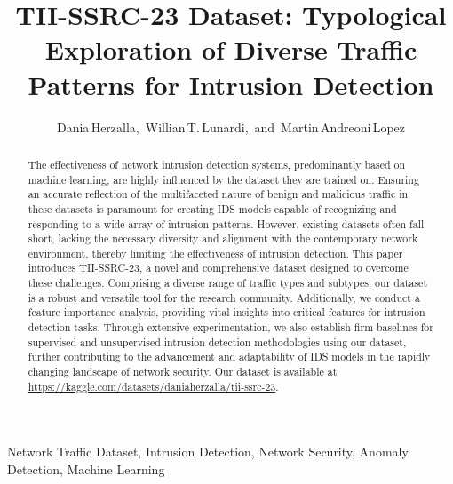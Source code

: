 \documentclass[lettersize,journal]{IEEEtran}
\begin{document}
 
 
\title{TII-SSRC-23 Dataset: Typological Exploration of Diverse Traffic Patterns for Intrusion Detection}
 

\author{Dania\,Herzalla,~Willian\,T.\,Lunardi,~and~Martin\,Andreoni\,Lopez

}


\maketitle

\begin{abstract}
The effectiveness of network intrusion detection systems, predominantly based on machine learning, are highly influenced by the dataset they are trained on. 
Ensuring an accurate reflection of the multifaceted nature of benign and malicious traffic in these datasets is paramount for creating IDS models capable of recognizing and responding to a wide array of intrusion patterns. However, existing datasets often fall short, lacking the necessary diversity and alignment with the contemporary network environment, thereby limiting the effectiveness of intrusion detection. This paper introduces TII-SSRC-23, a novel and comprehensive dataset designed to overcome these challenges. Comprising a diverse range of traffic types and subtypes, our dataset is a robust and versatile tool for the research community. Additionally, we conduct a feature importance analysis, providing vital insights into critical features for intrusion detection tasks. Through extensive experimentation, we also establish firm baselines for supervised and unsupervised intrusion detection methodologies using our dataset, further contributing to the advancement and adaptability of IDS models in the rapidly changing landscape of network security. Our dataset is available at \url{https://kaggle.com/datasets/daniaherzalla/tii-ssrc-23}.
\end{abstract}

\begin{IEEEkeywords}
Network Traffic Dataset, Intrusion Detection, Network Security, Anomaly Detection, Machine Learning
\end{IEEEkeywords}
\end{document}
